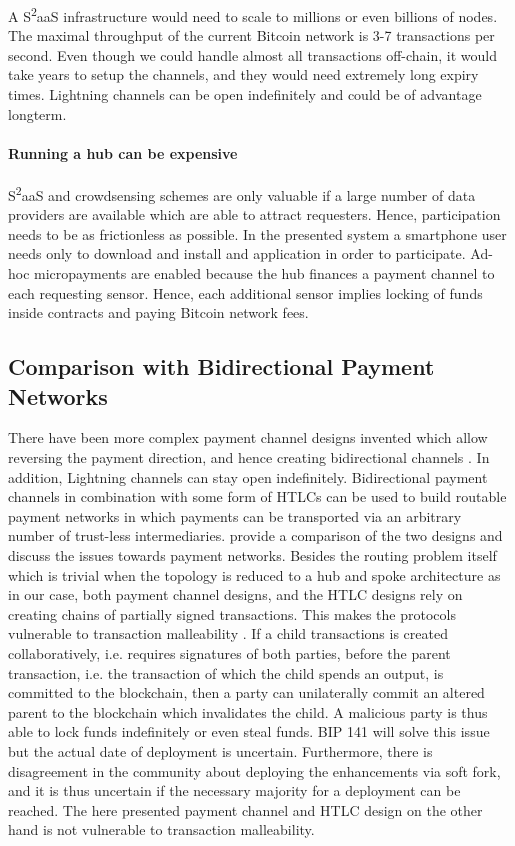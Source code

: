A S\textsuperscript{2}aaS infrastructure would need to scale to millions or even billions of nodes. The maximal throughput of the current Bitcoin network is 3-7 transactions per second. Even though we could handle almost all transactions off-chain, it would take years to setup the channels, and they would need extremely long expiry times. 
Lightning channels \parencite{poonbitcoin} can be open indefinitely and could be of advantage longterm. 

\paragraph{Running a hub can be expensive}

S\textsuperscript{2}aaS and crowdsensing schemes are only valuable if a large number of data providers are available which are able to attract requesters. Hence, participation needs to be as frictionless as possible. In the presented system a smartphone user needs only to download and install and application in order to participate. Ad-hoc micropayments are enabled because the hub finances a payment channel to each requesting sensor. Hence, each additional sensor implies locking of funds inside contracts and paying Bitcoin network fees.

\subsection{Comparison with Bidirectional Payment Networks}
\label{sec:paymentnetworks}

There have been more complex payment channel designs invented which allow reversing the payment direction, and hence creating bidirectional channels \parencite{decker2015Duplex,poonbitcoin}. In addition, Lightning channels \parencite{poonbitcoin} can stay open indefinitely. Bidirectional payment channels in combination with some form of \ac{HTLC}s can be used to build routable payment networks in which payments can be transported via an arbitrary number of trust-less intermediaries. \cite{cryptoeprint:2016:408} provide a comparison of the two designs and discuss the issues towards payment networks. Besides the routing problem itself which is trivial when the topology is reduced to a hub and spoke architecture as in our case, both payment channel designs, and the \ac{HTLC} designs rely on creating chains of partially signed transactions. This makes the protocols vulnerable to transaction malleability \parencite{Andrychowicz2015}. If a child transactions is created collaboratively, i.e.  requires signatures of both parties, before the parent transaction, i.e. the transaction of which the child spends an output, is committed to the blockchain, then a party can unilaterally commit an altered parent to the blockchain which invalidates the child. A malicious party is thus able to lock funds indefinitely or even steal funds. \ac{BIP} 141 \parencite{bip141} will solve this issue but the actual date of deployment is uncertain. Furthermore, there is disagreement in the community about deploying the enhancements via soft fork, and it is thus uncertain if the necessary majority for a deployment can be reached. The here presented payment channel and \ac{HTLC} design on the other hand is not vulnerable to transaction malleability. 

